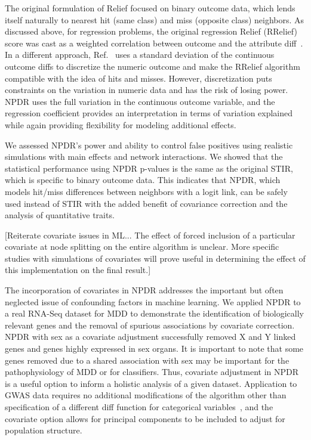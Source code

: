 \documentclass[10pt]{article}
\begin{document}
The original formulation of Relief focused on binary outcome data, which lends itself naturally to nearest hit (same class) and miss (opposite class) neighbors. As discussed above, for regression problems, the original regression Relief (RRelief) score was cast as a weighted correlation between outcome and the attribute diff~\cite{robnik03}. In a different approach, Ref.~\cite{urbanowicz17} uses a standard deviation of the continuous outcome diffs to discretize the numeric outcome and make the RRelief algorithm compatible with the idea of hits and misses. However, discretization puts constraints on the variation in numeric data and has the risk of losing power. NPDR uses the full variation in the continuous outcome variable, and the regression coefficient provides an interpretation in terms of variation explained while again providing flexibility for modeling additional effects. 

We assessed NPDR's power and ability to control false positives using realistic simulations with main effects and network interactions. We showed that the statistical performance using NPDR p-values is the same as the original STIR, which is specific to binary outcome data. This indicates that NPDR, which models hit/miss differences between neighbors with a logit link, can be safely used instead of STIR with the added benefit of covariance correction and the analysis of quantitative traits.  

[Reiterate covariate issues in ML... The effect of forced inclusion of a particular covariate at node splitting on the entire algorithm is unclear.
More specific studies with simulations of covariates will prove useful in determining the effect of this implementation on the final result.]

The incorporation of covariates in NPDR addresses the important but often neglected issue of confounding factors in machine learning. We applied NPDR to a real RNA-Seq dataset for MDD to demonstrate the identification of biologically relevant genes and the removal of spurious associations by covariate correction. NPDR with sex as a covariate adjustment successfully removed X and Y linked genes and genes highly expressed in sex organs. It is important to note that some genes removed due to a shared association with sex may be important for the pathophysiology of MDD or for classifiers.  Thus, covariate adjustment in NPDR is a useful option to inform a holistic analysis of a given dataset. Application to GWAS data requires no additional modifications of the algorithm other than specification of a different diff function for categorical variables~\cite{titv}, and the covariate option allows for principal components to be included to adjust for population structure. 
\end{document}
